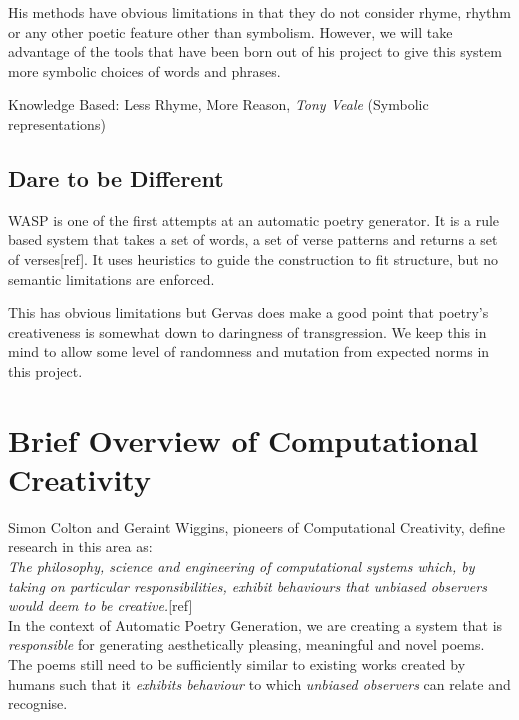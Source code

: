 His methods have obvious limitations in that they do not consider rhyme, rhythm or any other poetic feature other than symbolism. However, we will take advantage of the tools that have been born out of his project to give this system more symbolic choices of words and phrases.

Knowledge Based: Less Rhyme, More Reason, \textit{Tony Veale} (Symbolic representations)


\subsection{Dare to be Different}
WASP is one of the first attempts at an automatic poetry generator. It is a rule based system that takes a set of words, a set of verse patterns and returns a set of verses[ref]. It uses heuristics to guide the construction to fit structure, but no semantic limitations are enforced.

This has obvious limitations but Gervas does make a good point that poetry's creativeness is somewhat down to daringness of transgression. We keep this in mind to allow some level of randomness and mutation from expected norms in this project. 


\section{Brief Overview of Computational Creativity}
Simon Colton and Geraint Wiggins, pioneers of Computational Creativity, define research in this area as: \\
\textit{The philosophy, science and engineering of computational systems which, by taking on particular responsibilities, exhibit behaviours that unbiased observers would deem to be creative.}[ref]\\

In the context of Automatic Poetry Generation, we are creating a system that is \textit{responsible} for generating aesthetically pleasing, meaningful and novel poems. The poems still need to be sufficiently similar to existing works created by humans such that it \textit{exhibits behaviour} to which \textit{unbiased observers} can relate and recognise.

